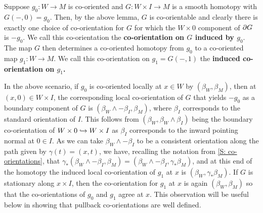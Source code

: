 \begin{definition}\label{D: homotopy co-orientation}
	Suppose $g_0 \colon W \to M$ is co-oriented and $G \colon W \times I \to M$ is a smooth homotopy with $G(-,0) = g_0$.
	Then, by the above lemma, $G$ is co-orientable and clearly there is exactly one choice of co-orientation for $G$ for which the $W \times 0$ component of $\partial G$ is $-g_0$.
	We call this co-orientation the \textbf{co-orientation on $G$ induced by $g_0$}.
	The map $G$ then determines a co-oriented homotopy from $g_0$ to a co-oriented map $g_1 \colon W \to M$.
	We call this co-orientation on $g_1 = G(-,1)$ the \textbf{induced co-orientation on $g_1$.}
\end{definition}

\begin{remark}\label{R: stationary homotopy}
	In the above scenario, if $g_0$ is co-oriented locally at $x \in W$ by $(\beta_W,\beta_M)$, then at $(x,0) \in W \times I$, the corresponding local co-orientation of $G$ that yields $-g_0$ as a boundary component of $G$ is $(\beta_W \wedge -\beta_I, \beta_M)$, where $\beta_I$ corresponds to the standard orientation of $I$.
	This follows from $(\beta_W,\beta_W \wedge \beta_I)$ being the boundary co-orientation of $W \times 0 \hookrightarrow W \times I$ as $\beta_I$ corresponds to the inward pointing normal at $0 \in I$.
	As we can take $\beta_W \wedge -\beta_I$ to be a consistent orientation along the path given by $\gamma(t) = (x,t)$, we have, recalling the notation from \cref{S: co-orientations}, that $\gamma_*(\beta_W \wedge -\beta_I, \beta_M) = (\beta_W \wedge -\beta_I,\gamma_*\beta_M)$, and at this end of the homotopy the induced local co-orientation of $g_1$ at $x$ is $(\beta_W,\gamma_*\beta_M)$.
	If $G$ is stationary along $x \times I$, then the co-orientation for $g_1$ at $x$ is again $(\beta_W,\beta_M)$ so that the co-orientations of $g_0$ and $g_1$ agree at $x$.
	This observation will be useful below in showing that pullback co-orientations are well defined.
\end{remark}

